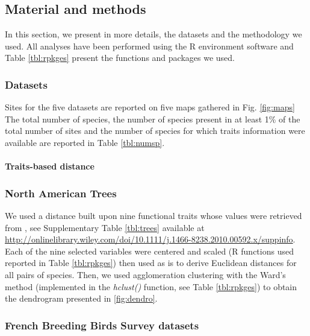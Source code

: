 \label{chap3si}

\subsection{Material and methods}\label{material-and-methods-1}

In this section, we present in more details, the datasets and the
methodology we used. All analyses have been performed using the R
environment software and Table \ref{tbl:rpkges} present the functions
and packages we used.

\subsubsection{Datasets}\label{datasets-1}

Sites for the five datasets are reported on five maps gathered in Fig.
\ref{fig:maps} The total number of species, the number of species
present in at least 1\% of the total number of sites and the number of
species for which traits information were available are reported in
Table \ref{tbl:numsp}.

\paragraph{Traits-based distance}\label{traits-based-distance}

\subsubsection{North American Trees}\label{north-american-trees}

We used a distance built upon nine functional traits whose values were
retrieved from \citep{Paquette2011}, see Supplementary Table
\ref{tbl:trees} available at
\url{http://onlinelibrary.wiley.com/doi/10.1111/j.1466-8238.2010.00592.x/suppinfo}.
Each of the nine selected variables were centered and scaled (R
functions used reported in Table \ref{tbl:rpkges}) then used as is to
derive Euclidean distances for all pairs of species. Then, we used
agglomeration clustering with the Ward's method (implemented in the
\emph{hclust()} function, see Table \ref{tbl:rpkges}) to obtain the
dendrogram presented in \ref{fig:dendro}.

\subsubsection{French Breeding Birds Survey
datasets}\label{french-breeding-birds-survey-datasets}


